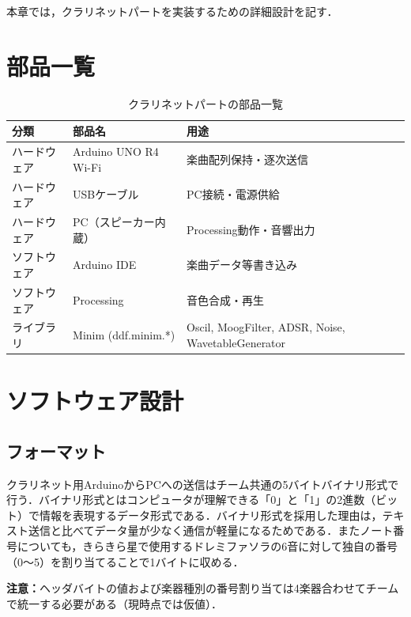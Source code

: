 \documentclass[uplatex,dvipdfmx,report]{jlreq}
\begin{document}
本章では，クラリネットパートを実装するための詳細設計を記す．


\section{部品一覧}


\begin{table}[H]
  \centering
  \caption{クラリネットパートの部品一覧}
  \label{tab:pbs}
  \begin{tabular}{l l l}
    \toprule
    分類 & 部品名 & 用途 \\
    \midrule
    ハードウェア & Arduino UNO R4 Wi-Fi & 楽曲配列保持・逐次送信 \\
    ハードウェア & USBケーブル & PC接続・電源供給 \\
    ハードウェア & PC（スピーカー内蔵） & Processing動作・音響出力 \\
    ソフトウェア & Arduino IDE & 楽曲データ等書き込み \\
    ソフトウェア & Processing & 音色合成・再生 \\
    ライブラリ & Minim (ddf.minim.*) & Oscil, MoogFilter, ADSR, Noise, WavetableGenerator \\
    \bottomrule
  \end{tabular}
\end{table}

\section{ソフトウェア設計}

\subsection{フォーマット}

クラリネット用ArduinoからPCへの送信はチーム共通の5バイトバイナリ形式で行う．バイナリ形式とはコンピュータが理解できる「0」と「1」の2進数（ビット）で情報を表現するデータ形式である．バイナリ形式を採用した理由は，テキスト送信と比べてデータ量が少なく通信が軽量になるためである．またノート番号についても，きらきら星で使用するドレミファソラの6音に対して独自の番号（0〜5）を割り当てることで1バイトに収める．

\noindent\textbf{注意：}ヘッダバイトの値および楽器種別の番号割り当ては4楽器合わせてチームで統一する必要がある（現時点では仮値）．
\end{document}

